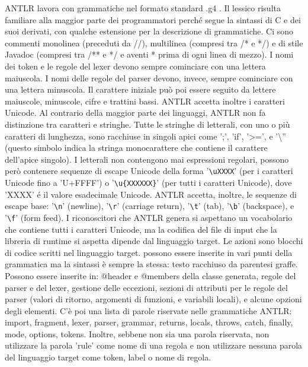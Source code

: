 \documentclass{article}
\theoremstyle{plain}
\theoremstyle{definition}
\theoremstyle{plain}
\begin{document}
\bigskip
ANTLR lavora con grammatiche nel formato standard .g4 . Il lessico risulta familiare alla maggior parte dei programmatori perché segue la sintassi di C e dei suoi derivati, con qualche estensione per la descrizione di grammatiche. Ci sono commenti monolinea (preceduti da //), multilinea (compresi tra /* e */) e di stile Javadoc (compresi tra /** e */ e aventi * prima di ogni linea di mezzo). I nomi dei token e le regole del lexer devono sempre cominciare con una lettera maiuscola. I nomi delle regole del parser devono, invece, sempre cominciare con una lettera minuscola. Il carattere iniziale può poi essere seguito da lettere maiuscole, minuscole, cifre e trattini bassi. ANTLR accetta inoltre i caratteri Unicode. Al contrario della maggior parte dei linguaggi, ANTLR non fa distinzione tra caratteri e stringhe. Tutte le stringhe di letterali, con uno o più caratteri di lunghezza, sono racchiuse in singoli apici come ';', 'if', '\textgreater=', e '\textbackslash'' (questo simbolo indica la stringa monocarattere che contiene il carattere dell'apice singolo). I letterali non contengono mai espressioni regolari, possono però contenere sequenze di escape Unicode della forma '\verb|\uXXXX|' (per i caratteri Unicode fino a 'U+FFFF') o '\verb|\u{XXXXXX}|' (per tutti i caratteri Unicode), dove 'XXXX' é il valore esadecimale Unicode.
ANTLR accetta, inoltre, le sequenze di escape base: '\verb|\n|' (newline), '\verb|\r|' (carriage return), '\verb|\t|' (tab), '\verb|\b|' (backspace), e '\verb|\f|' (form feed). I riconoscitori che ANTLR genera si aspettano un vocabolario che contiene tutti i caratteri Unicode, ma la codifica del file di input che la libreria di runtime si aspetta dipende dal linguaggio target.
Le azioni sono blocchi di codice scritti nel linguaggio target. possono essere inserite in vari punti della grammatica ma la sintassi è sempre la stessa: testo racchiuso da parentesi graffe. Possono essere inserite in: @header e @members della classe generata, regole del parser e del lexer, gestione delle eccezioni, sezioni di attributi per le regole del parser (valori di ritorno, argomenti di funzioni, e variabili locali), e alcune opzioni degli elementi. C'è poi una lista di parole riservate nelle grammatiche ANTLR: import, fragment, lexer, parser, grammar, returns, locals, throws, catch, finally, mode, options, tokens. Inoltre, sebbene non sia una parola riservata, non utilizzare la parola 'rule' come nome di una regola e non utilizzare nessuna parola del linguaggio target come token, label o nome di regola.
\end{document}
